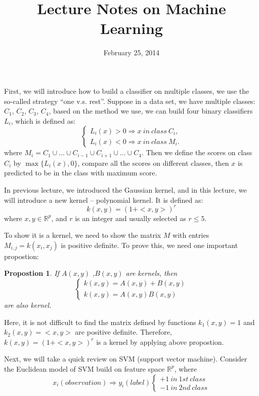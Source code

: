 \documentclass{article}
\title{Lecture Notes on Machine Learning}
\date{February 25, 2014}
\newtheorem{propostion}{Propostion}
\begin{document}
\maketitle

First, we will introduce how to build a classifier on multiple classes, we use the so-called strategy ``one v.s. rest''. Suppose in a data set, we 
have multiple classes: $C_{1}$, $C_{2}$, $C_{3}$, $C_{4}$, based on the method we use, we can build four binary classifiers $L_{i}$, which is defined
as:
\begin{equation*}
 \begin{cases}
  L_{i}(x) > 0 \Longrightarrow x \ in \ class \ C_{i}, \\
  L_{i}(x) < 0 \Longrightarrow x \ in \ class \ M_{i}.
 \end{cases}
\end{equation*}
where $M_{i} = C_{1}\cup...\cup C_{i-1}\cup C_{i+1}\cup...\cup C_{4}$. Then we define the scores on class $C_{i}$ by $\max\{L_{i}(x),0\}$, compare all 
the scores on different classes, then $x$ is predicted to be in the class with maximum score.

In previous lecture, we introduced the Gaussian kernel, and in this lecture, we will introduce a new kernel -- polynomial kernel. It is defined as:
\begin{equation*}
 k(x,y) = (1+<x,y>)^{r}
\end{equation*}
where $x,y \in \mathbb{R}^{p}$, and $r$ is an integer and usually selected as $r \leq 5$. 

To show it is a kernel, we need to show the matrix $M$ with entries $M_{i,j} = k(x_{i},x_{j})$ is positive definite. To prove this, we need one
important propostion:
\begin{propostion}
 If $A(x,y)$ ,$B(x,y)$ are kernels, then
 \begin{equation*}
  \begin{cases}
   k(x,y) =  A(x,y)+B(x,y)\\
   k(x,y) =  A(x,y)B(x,y)
  \end{cases}
\end{equation*}
 are also kernel.
\end{propostion}
Here, it is not difficult to find the matrix defined by functions $k_{1}(x,y) = 1$ and $k_{2}(x,y) = <x,y>$ are positive definite. Therefore, 
$k(x,y) = (1+<x,y>)^{r}$ is a kernel by applying above propostion.

Next, we will take a quick review on SVM (support vector machine). Consider the Euclidean model of SVM build on feature space $\mathbb{R}^{p}$,
where
\begin{equation*}
 x_{i}(observation) \Longrightarrow y_{i}(label) \begin{cases} +1 \ in \ 1st \ class \\ -1 \ in \ 2nd \ class \end{cases}
\end{equation*}
\end{document}
